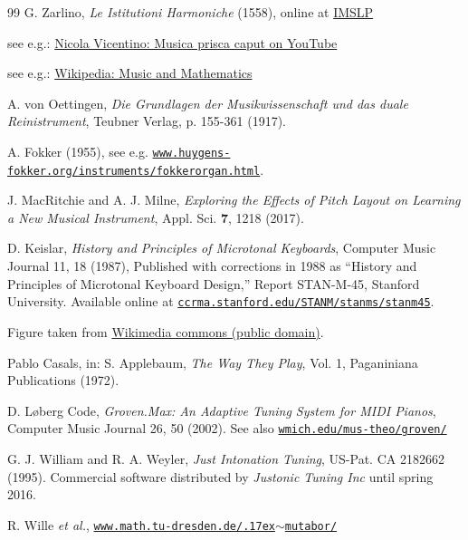 \documentclass[a4paper,11pt]{iopart}
\begin{document}
\begin{thebibliography}{99}
G. Zarlino, \textit{Le Istitutioni Harmoniche} (1558), online at \href{http://imslp.org/wiki/Le_Istitutioni_Harmoniche_(Zarlino,_Gioseffo)}{IMSLP}

see e.g.: \href{https://www.youtube.com/watch?v=0akGtDPVRxk}{Nicola Vicentino: Musica prisca caput on YouTube}

see e.g.: \href{https://en.wikipedia.org/wiki/Music_and_mathematics}{Wikipedia: Music and Mathematics}

A. von Oettingen, \textit{Die Grundlagen der Musikwissenschaft und das duale Reinistrument}, Teubner Verlag, p. 155-361 (1917).

A. Fokker (1955), see e.g. \href{http://www.huygens-fokker.org/instruments/fokkerorgan.html}{\texttt{www.huygens-fokker.org/instruments/fokkerorgan.html}}.

J. MacRitchie and A. J. Milne,
\textit{Exploring the Effects of Pitch Layout on Learning a New Musical Instrument},
Appl. Sci. \textbf{7}, 1218 (2017).

D. Keislar, \textit{History and Principles of Microtonal Keyboards}, Computer Music Journal 11, 18 (1987), Published with corrections in 1988 as “History and Principles of
Microtonal Keyboard Design,” Report STAN-M-45, Stanford University.
Available online at \href{http://ccrma.stanford.edu/STANM/stanms/stanm45}{\texttt{ccrma.stanford.edu/STANM/stanms/stanm45}}.

Figure taken from \href{https://commons.wikimedia.org/wiki/File:Orthotonophonium.jpg}{Wikimedia commons (public domain)}.

Pablo Casals, in: S. Applebaum, \textit{The Way They Play}, Vol. 1, Paganiniana Publications (1972).

D. L\o{}berg Code, \textit{Groven.Max: An Adaptive Tuning System for MIDI Pianos}, Computer Music Journal 26, 50 (2002). See also \href{http://wmich.edu/mus-theo/groven/}{\tt wmich.edu/mus-theo/groven/}

G. J. William and R. A. Weyler, \textit{Just Intonation Tuning}, US-Pat. CA 2182662 (1995). Commercial software distributed by \textit{Justonic Tuning Inc} until spring 2016.

R. Wille \textit{et al.}, \href{http://www.math.tu-dresden.de/~mutabor/}{\tt www.math.tu-dresden.de/{\raise.17ex\hbox{$\scriptstyle\sim$}}mutabor/}


\end{thebibliography}
\end{document}
